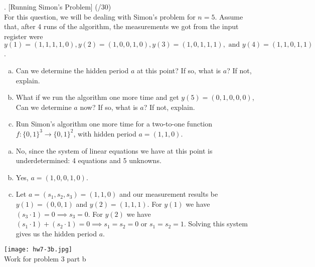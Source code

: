 \documentclass[11pt]{article}
\newenvironment{solution}{\begin{mdframed}[skipabove=\baselineskip,innertopmargin=\baselineskip,innerbottommargin=\baselineskip]
  }{\end{mdframed}}
\begin{document}
. [Running Simon's Problem] (/30)
\\
For this question, we will be dealing with Simon’s problem for $n= 5$.  Assume that, after 4 runs of the algorithm, the measurements we got from the input register were $y(1)=  (1,1,1,1,0), y(2)=  (1,0,0,1,0), y(3)=  (1,0,1,1,1), \text{ and } y(4)=  (1,1,0,1,1)$.
\begin{enumerate}[(a)] 
\item Can we determine the hidden period $a$ at this point?  If so, what is $a$?  If not, explain.
\item What if we run the algorithm one more time and get $y(5)=  (0,1,0,0,0)$,  Can we determine $a$ now?  If so, what is $a$?  If not, explain.
\item Run Simon's algorithm one more time for a two-to-one function $f:\{0,1\}^3\xrightarrow{}\{0,1\}^2$, with hidden period $a=(1,1,0)$.
\end{enumerate}

\begin{solution}
\begin{enumerate}[(a)]
    \item No, since the system of linear equations we have at this point is underdetermined: 4 equations and 5 unknowns.
    \item Yes, $a = (1,0,0,1,0)$.
    \item Let $a = (s_1,s_2,s_3) = (1,1,0)$ and our measurement results be $y(1) = (0,0,1)$ and $y(2) = (1,1,1)$. For $y(1)$ we have $(s_3\cdot 1) = 0 \implies s_3 = 0$. For $y(2)$ we have $(s_1\cdot 1) + (s_2\cdot 1) = 0 \implies s_1 = s_2 = 0$ or $s_1 = s_2 = 1$. Solving this system gives us the hidden period $a$. 
\end{enumerate}
\end{solution}

\texttt{[image: hw7-3b.jpg]} \\ Work for problem 3 part b
 
 
 
\end{document}
